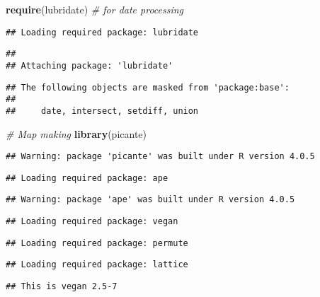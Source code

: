 \documentclass[
]{article}
\newenvironment{Shaded}{\begin{snugshade}}{\end{snugshade}}
\newcommand{\CommentTok}[1]{\textcolor[rgb]{0.56,0.35,0.01}{\textit{#1}}}
\newcommand{\KeywordTok}[1]{\textcolor[rgb]{0.13,0.29,0.53}{\textbf{#1}}}
\newcommand{\NormalTok}[1]{#1}
\begin{document}
\begin{Shaded}
\begin{Highlighting}[]
\KeywordTok{require}\NormalTok{(lubridate) }\CommentTok{# for date processing}
\end{Highlighting}
\end{Shaded}

\begin{verbatim}
## Loading required package: lubridate
\end{verbatim}

\begin{verbatim}
## 
## Attaching package: 'lubridate'
\end{verbatim}

\begin{verbatim}
## The following objects are masked from 'package:base':
## 
##     date, intersect, setdiff, union
\end{verbatim}

\begin{Shaded}
\begin{Highlighting}[]
\CommentTok{# Map making}
\KeywordTok{library}\NormalTok{(picante)}
\end{Highlighting}
\end{Shaded}

\begin{verbatim}
## Warning: package 'picante' was built under R version 4.0.5
\end{verbatim}

\begin{verbatim}
## Loading required package: ape
\end{verbatim}

\begin{verbatim}
## Warning: package 'ape' was built under R version 4.0.5
\end{verbatim}

\begin{verbatim}
## Loading required package: vegan
\end{verbatim}

\begin{verbatim}
## Loading required package: permute
\end{verbatim}

\begin{verbatim}
## Loading required package: lattice
\end{verbatim}

\begin{verbatim}
## This is vegan 2.5-7
\end{verbatim}
\end{document}
